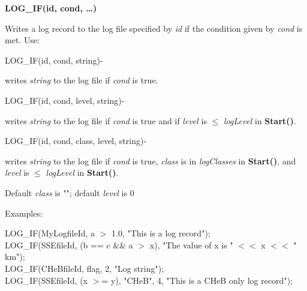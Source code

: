 \newpage
\textbf{LOG\_IF(id, cond, {\dots})}

Writes a log record to the log file specified by \textit{id} if the condition given by \textit{cond} is met.  Use:

\hfill
\begin{minipage}{\dimexpr\textwidth-2em}

        \medskip
        \begin{minipage}[t][][b]{16.0em}LOG\_IF(id, cond, string)\hfill{-}\end{minipage}
        \begin{minipage}[t][][b]{\dimexpr\textwidth-16.2em}
            writes \textit{string} to the log file if \textit{cond} is true.
        \end{minipage}\vfill

        \medskip
        \begin{minipage}[t][][b]{16.0em}LOG\_IF(id, cond, level, string)\hfill{-}\end{minipage}
        \begin{minipage}[t][][b]{\dimexpr\textwidth-16.2em}
            writes \textit{string} to the log file if \textit{cond} is true and if \textit{level} is $\leq$ \textit{logLevel} in \textbf{Start()}.
        \end{minipage}\vfill

        \medskip
        \begin{minipage}[t][][b]{16.0em}LOG\_IF(id, cond, class, level, string)\hfill{-}\end{minipage}
        \begin{minipage}[t][][b]{\dimexpr\textwidth-16.2em}
            writes \textit{string} to the log file if \textit{cond} is true, \textit{class} is in \textit{logClasses} in \textbf{Start()}, and \textit{level} is $\leq$ \textit{logLevel} in \textbf{Start()}.
        \end{minipage}\vfill

    \medskip
    Default \textit{class} is ""; default \textit{level} is 0

    \medskip
    Examples:

    \medskip
    \tabto{3em}LOG\_IF(MyLogfileId, a $>$ 1.0, "This is a log record"); \\
    \tabto{3em}LOG\_IF(SSEfileId, (b == c \&\& a $>$ x), "The value of x is " $<<$ x $<<$ " km"); \\
    \tabto{3em}LOG\_IF(CHeBfileId, flag, 2, "Log string"); \\
    \tabto{3em}LOG\_IF(SSEfileId, (x $>$= y), "CHeB", 4, "This is a CHeB only log record");
\end{minipage}

